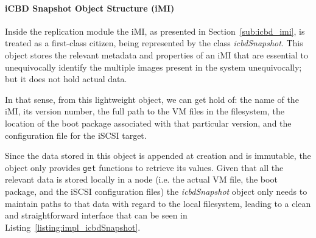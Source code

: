 \paragraph{iCBD Snapshot Object Structure (iMI)}
\label{par:impl_icbdrep_snapshot}




Inside the replication module the iMI, as presented in Section~\ref{sub:icbd_imi}, is treated as a first-class citizen, being represented by the class \textit{icbdSnapshot}. This object stores the relevant metadata and properties of an iMI that are essential to unequivocally identify the multiple images present in the system unequivocally; but it does not hold actual data.

In that sense, from this lightweight object, we can get hold of: the name of the iMI, its version number, the full path to the VM files in the filesystem, the location of the boot package associated with that particular version, and the configuration file for the iSCSI target.

Since the data stored in this object is appended at creation and is immutable, the object only provides \texttt{get} functions to retrieve its values. Given that all the relevant data is stored locally in a node (i.e. the actual VM file, the boot package, and the iSCSI configuration files) the \textit{icbdSnapshot} object only needs to maintain paths to that data with regard to the local filesystem, leading to a clean and straightforward interface that can be seen in Listing~\ref{listing:impl_icbdSnapshot}.

